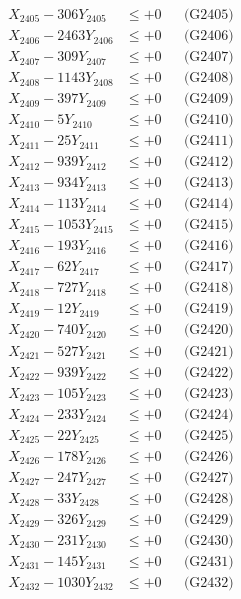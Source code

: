 \documentclass[a4paper,10pt]{article}
\begin{document}
{\begin{align}
X_{2405} - 306Y_{2405} &\leq +0 && \text{(G2405)} \\
X_{2406} - 2463Y_{2406} &\leq +0 && \text{(G2406)} \\
X_{2407} - 309Y_{2407} &\leq +0 && \text{(G2407)} \\
X_{2408} - 1143Y_{2408} &\leq +0 && \text{(G2408)} \\
X_{2409} - 397Y_{2409} &\leq +0 && \text{(G2409)} \\
X_{2410} - 5Y_{2410} &\leq +0 && \text{(G2410)} \\
\allowbreak
X_{2411} - 25Y_{2411} &\leq +0 && \text{(G2411)} \\
X_{2412} - 939Y_{2412} &\leq +0 && \text{(G2412)} \\
X_{2413} - 934Y_{2413} &\leq +0 && \text{(G2413)} \\
X_{2414} - 113Y_{2414} &\leq +0 && \text{(G2414)} \\
X_{2415} - 1053Y_{2415} &\leq +0 && \text{(G2415)} \\
X_{2416} - 193Y_{2416} &\leq +0 && \text{(G2416)} \\
X_{2417} - 62Y_{2417} &\leq +0 && \text{(G2417)} \\
X_{2418} - 727Y_{2418} &\leq +0 && \text{(G2418)} \\
X_{2419} - 12Y_{2419} &\leq +0 && \text{(G2419)} \\
X_{2420} - 740Y_{2420} &\leq +0 && \text{(G2420)} \\
\allowbreak
X_{2421} - 527Y_{2421} &\leq +0 && \text{(G2421)} \\
X_{2422} - 939Y_{2422} &\leq +0 && \text{(G2422)} \\
X_{2423} - 105Y_{2423} &\leq +0 && \text{(G2423)} \\
X_{2424} - 233Y_{2424} &\leq +0 && \text{(G2424)} \\
X_{2425} - 22Y_{2425} &\leq +0 && \text{(G2425)} \\
X_{2426} - 178Y_{2426} &\leq +0 && \text{(G2426)} \\
X_{2427} - 247Y_{2427} &\leq +0 && \text{(G2427)} \\
X_{2428} - 33Y_{2428} &\leq +0 && \text{(G2428)} \\
X_{2429} - 326Y_{2429} &\leq +0 && \text{(G2429)} \\
X_{2430} - 231Y_{2430} &\leq +0 && \text{(G2430)} \\
\allowbreak
X_{2431} - 145Y_{2431} &\leq +0 && \text{(G2431)} \\
X_{2432} - 1030Y_{2432} &\leq +0 && \text{(G2432)} \\

\end{align}}
\end{document}
